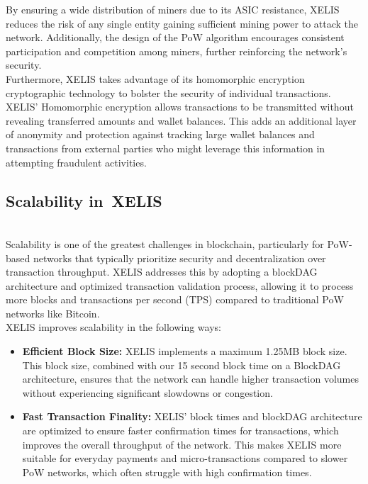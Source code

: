 \documentclass[10pt,a4paper,twocolumn]{article}
\begin{document}
By ensuring a wide distribution of miners due to its ASIC resistance, XELIS reduces the risk of any single entity gaining sufficient mining power to attack the network. Additionally, the design of the PoW algorithm encourages consistent participation and competition among miners, further reinforcing the network's security.\\

Furthermore, XELIS takes advantage of its homomorphic encryption cryptographic technology to bolster the security of individual transactions. XELIS' Homomorphic encryption allows transactions to be transmitted without revealing transferred amounts and wallet balances. This adds an additional layer of anonymity and protection against tracking large wallet balances and transactions from external parties who might leverage this information in attempting fraudulent activities.\\


\subsection{Scalability in XELIS}\\

Scalability is one of the greatest challenges in blockchain, particularly for PoW-based networks that typically prioritize security and decentralization over transaction throughput. XELIS addresses this by adopting a blockDAG architecture and optimized transaction validation process, allowing it to process more blocks and transactions per second (TPS) compared to traditional PoW networks like Bitcoin.\\

XELIS improves scalability in the following ways:
\begin{itemize}
    \item \textbf{Efficient Block Size:} XELIS implements a maximum 1.25MB block size. This block size, combined with our 15 second block time on a BlockDAG architecture, ensures that the network can handle higher transaction volumes without experiencing significant slowdowns or congestion.
    \item \textbf{Fast Transaction Finality:} XELIS' block times and blockDAG architecture are optimized to ensure faster confirmation times for transactions, which improves the overall throughput of the network. This makes XELIS more suitable for everyday payments and micro-transactions compared to slower PoW networks, which often struggle with high confirmation times.
\end{itemize}
\end{document}

